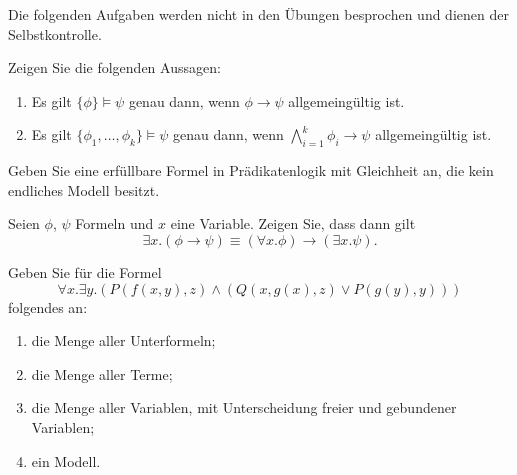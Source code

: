\documentclass[german]{latteachCD}[2017/03/28]
\begin{document}
\maketitle

\begin{mdframed}
  Die folgenden Aufgaben werden nicht in den Übungen besprochen und dienen der
  Selbstkontrolle.

  \renewcommand{\theexercise}{\Roman{exercise}}
  \setcounter{exercise}{0}

  \begin{exercise}
    Zeigen Sie die folgenden Aussagen:
    \begin{enumerate}
    \item Es gilt $\{\phi\} \models \psi$ genau dann, wenn $\phi \to \psi$
      allgemeingültig ist.
    \item Es gilt $\{\phi_{1}, \dots, \phi_{k}\} \models \psi$ genau dann, wenn
      $\bigwedge_{i=1}^{k} \phi_{i} \to \psi$ allgemeingültig ist.
    \end{enumerate}
  \end{exercise}

  \begin{exercise}
    Geben Sie eine erfüllbare Formel in Prädikatenlogik mit Gleichheit an, die
    kein endliches Modell besitzt.
  \end{exercise}

  \begin{exercise}
    Seien $\phi$, $\psi$ Formeln und $x$ eine Variable.  Zeigen Sie, dass dann gilt
    \begin{equation*}
      \exists x.(\phi \to \psi) \equiv (\forall x. \phi) \to (\exists x. \psi).
    \end{equation*}
  \end{exercise}
\end{mdframed}

\vspace*{0.5\baselineskip}

\setcounter{exercise}{0}

\begin{exercise}
  Geben Sie für die Formel
  \begin{equation*}
    \forall x. \exists y. (P(f(x,y),z) \land (Q(x,g(x),z) \lor P(g(y),y)))
  \end{equation*}
  folgendes an:
  \begin{enumerate}
  \item die Menge aller Unterformeln;
  \item die Menge aller Terme;
  \item die Menge aller Variablen, mit Unterscheidung freier und gebundener
    Variablen;
  \item ein Modell.
  \end{enumerate}
\end{exercise}
\end{document}
